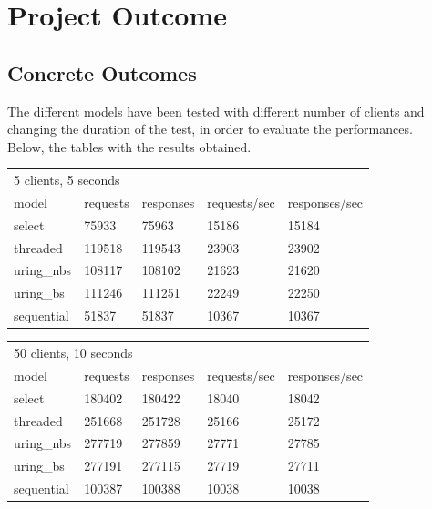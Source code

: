 \documentclass[10pt, oneside,english]{article}   	%
\begin{document}
\section{Project Outcome}

\subsection{Concrete Outcomes}

The different models have been tested with different number of clients and changing the duration of the test, in order to evaluate the performances. \\
Below, the tables with the results obtained.


\begin{table}[H]
\centering
\begin{tabular}{lllll}
\multicolumn{5}{l}{5 clients, 5 seconds}                         \\
model      & requests & responses & requests/sec & responses/sec \\
select     & 75933    & 75963     & 15186        & 15184         \\
threaded   & 119518   & 119543    & 23903        & 23902         \\
uring\_nbs & 108117   & 108102    & 21623        & 21620         \\
uring\_bs  & 111246   & 111251    & 22249        & 22250         \\
sequential & 51837    & 51837     & 10367        & 10367        
\end{tabular}
\end{table}

\begin{table}[H]
\centering
\begin{tabular}{lllll}
\multicolumn{5}{l}{50 clients, 10 seconds}                       \\
model      & requests & responses & requests/sec & responses/sec \\
select     & 180402   & 180422    & 18040        & 18042         \\
threaded   & 251668   & 251728    & 25166        & 25172         \\
uring\_nbs & 277719   & 277859    & 27771        & 27785         \\
uring\_bs  & 277191   & 277115    & 27719        & 27711         \\
sequential & 100387   & 100388    & 10038        & 10038        
\end{tabular}
\end{table}
\end{document}
